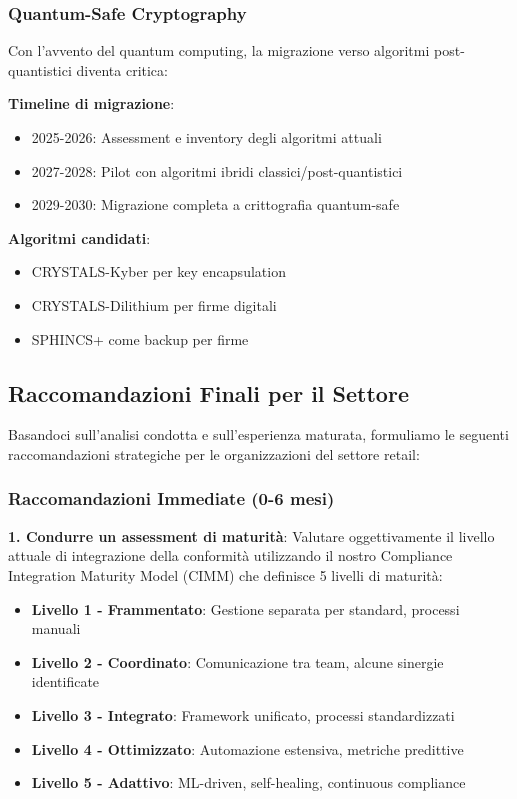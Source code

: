 \subsubsection{\texorpdfstring{Quantum-Safe Cryptography}{4.9.2.3 - Quantum-Safe Cryptography}}

Con l'avvento del quantum computing, la migrazione verso algoritmi post-quantistici diventa critica:

\textbf{Timeline di migrazione}:
\begin{itemize}
    \item 2025-2026: Assessment e inventory degli algoritmi attuali
    \item 2027-2028: Pilot con algoritmi ibridi classici/post-quantistici
    \item 2029-2030: Migrazione completa a crittografia quantum-safe
\end{itemize}

\textbf{Algoritmi candidati}:
\begin{itemize}
    \item CRYSTALS-Kyber per key encapsulation
    \item CRYSTALS-Dilithium per firme digitali
    \item SPHINCS+ come backup per firme
\end{itemize}

\subsection{\texorpdfstring{Raccomandazioni Finali per il Settore}{4.9.3 - Raccomandazioni Finali per il Settore}}
\label{subsec:4.9.3_raccomandazioni}

Basandoci sull'analisi condotta e sull'esperienza maturata, formuliamo le seguenti raccomandazioni strategiche per le organizzazioni del settore retail:

\subsubsection{\texorpdfstring{Raccomandazioni Immediate (0-6 mesi)}{4.9.3.1 - Raccomandazioni Immediate (0-6 mesi)}}

\textbf{1. Condurre un assessment di maturità}:
Valutare oggettivamente il livello attuale di integrazione della conformità utilizzando il nostro Compliance Integration Maturity Model (CIMM) che definisce 5 livelli di maturità:

\begin{itemize}
    \item \textbf{Livello 1 - Frammentato}: Gestione separata per standard, processi manuali
    \item \textbf{Livello 2 - Coordinato}: Comunicazione tra team, alcune sinergie identificate
    \item \textbf{Livello 3 - Integrato}: Framework unificato, processi standardizzati
    \item \textbf{Livello 4 - Ottimizzato}: Automazione estensiva, metriche predittive
    \item \textbf{Livello 5 - Adattivo}: ML-driven, self-healing, continuous compliance
\end{itemize}


